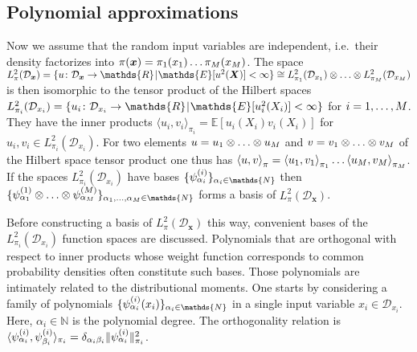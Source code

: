 \subsection{Polynomial approximations}
Now we assume that the random input variables are independent, i.e.\ their density factorizes into \(\pi(\bm{x}) = \pi_1(x_1) \ldots \pi_M(x_M)\).
The space \(L_{\pi}^2(\mathcal{D}_{\bm{x}}) = \{u \colon \mathcal{D}_{\bm{x}} \rightarrow \mathds{R} \cond \mathds{E}[u^2(\bm{X})] < \infty\}
\cong L_{\pi_1}^2(\mathcal{D}_{x_1}) \otimes \ldots \otimes L_{\pi_\dimParam}^2(\mathcal{D}_{x_\dimParam})\) is then isomorphic to the tensor product of the Hilbert spaces
\(L_{\pi_i}^2(\mathcal{D}_{x_i}) = \{u_i \colon \mathcal{D}_{x_i} \rightarrow \mathds{R} \cond \mathds{E}[u_i^2(X_i)] < \infty\}\) for \(i=1,\ldots,M\).
They have the inner products \(\langle u_i, v_i\rangle_{\pi_i} = \mathds{E}[u_i(X_i) v_i(X_i)]\) for \(u_i,v_i \in L_{\pi_i}^2(\mathcal{D}_{x_i})\).
For two elements \(u = u_1 \otimes \ldots \otimes u_M\) and \(v = v_1 \otimes \ldots \otimes v_M\) of the Hilbert space tensor product
one thus has \(\left\langle u,v \right\rangle_\pi = \left\langle u_1,v_1 \right\rangle_{\pi_1} \ldots \left\langle u_M,v_M \right\rangle_{\pi_M}\).
If the spaces \(L_{\pi_i}^2(\mathcal{D}_{x_i})\) have bases \(\{\basisU^{(i)}_{\alpha_i}\}_{\alpha_i \in \mathds{N}}\)
then \(\{\basisU^{(1)}_{\alpha_1} \otimes \ldots \otimes \basisU^{(\dimParam)}_{\alpha_\dimParam}\}_{\alpha_1,\ldots,\alpha_\dimParam \in \mathds{N}}\)
forms a basis of \(L_{\pi}^2(\mathcal{D}_{\bm{x}})\).
\par %
Before constructing a basis of \(L_{\pi}^2(\mathcal{D}_{\bm{x}})\) this way, convenient bases of the \(L_{\pi_i}^2(\mathcal{D}_{x_i})\) function spaces are discussed.
Polynomials that are orthogonal with respect to inner products whose weight function corresponds to common probability densities often constitute such bases.
Those polynomials are intimately related to the distributional moments.
One starts by considering a family of polynomials \(\{\basisU_{\alpha_i}^{(i)}(x_i)\}_{\alpha_i \in \mathds{N}}\) in a single input variable \(x_i \in \mathcal{D}_{x_i}\).
Here, \(\alpha_i \in \mathds{N}\) is the polynomial degree.
The orthogonality relation is \(\langle \psi^{(i)}_{\alpha_i}, \psi^{(i)}_{\beta_i} \rangle_{\pi_i} = \delta_{\alpha_i \beta_i} \lVert \psi^{(i)}_{\alpha_i} \rVert_{\pi_i}^2\).
